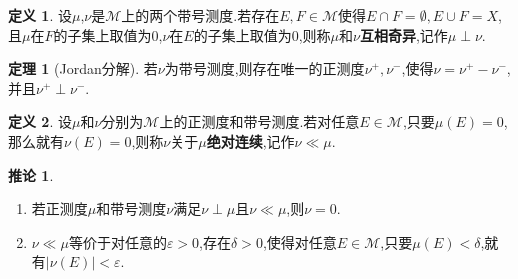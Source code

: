 \documentclass{ctexart}
\theoremstyle{definition}
\newtheorem{definition}{定义}
\newtheorem{theorem}{定理}
\newtheorem{corollary}{推论}
\theoremstyle{remark}
\begin{document}
	\begin{definition}
		设$\mu$,$\nu$是$\mathcal{M}$上的两个带号测度.若存在$E,F\in\mathcal{M}$使得$E\cap F=\emptyset,E\cup F=X$,且$\mu$在$F$的子集上取值为$0$,$\nu$在$E$的子集上取值为$0$,则称$\mu$和$\nu$\textbf{互相奇异},记作$\mu\perp\nu$.
	\end{definition}
	\begin{theorem}[Jordan分解]
		若$\nu$为带号测度,则存在唯一的正测度$\nu^+,\nu^-$,使得$\nu=\nu^+-\nu^-$,并且$\nu^+\perp\nu^-$.
	\end{theorem}
	
	\begin{definition}
		设$\mu$和$\nu$分别为$\mathcal{M}$上的正测度和带号测度.若对任意$E\in\mathcal{M}$,只要$\mu(E)=0$,那么就有$\nu(E)=0$,则称$\nu$关于$\mu$\textbf{绝对连续},记作$\nu\ll\mu$.
	\end{definition}
	\begin{corollary}
		\begin{enumerate}
			\item 若正测度$\mu$和带号测度$\nu$满足$\nu\perp\mu$且$\nu\ll\mu$,则$\nu=0$.
			\item $\nu\ll\mu$等价于对任意的$\varepsilon>0$,存在$\delta>0$,使得对任意$E\in\mathcal{M}$,只要$\mu(E)<\delta$,就有$|\nu(E)|<\varepsilon$.
		\end{enumerate}
	\end{corollary}
	
\end{document}
